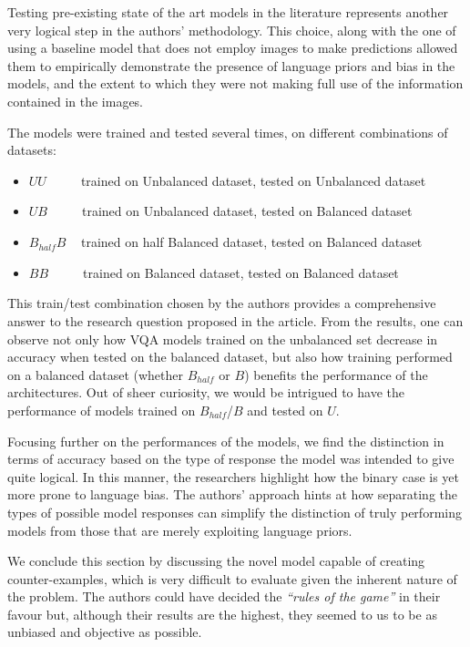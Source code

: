 \documentclass[letterpaper,11pt]{article}
\begin{document}
Testing pre-existing state of the art models in the literature represents another very logical step in the authors' methodology. This choice, along with the one of using a baseline model that does not employ images to make predictions allowed them to empirically demonstrate the presence of language priors and bias in the models, and the extent to which they were not making full use of the information contained in the images.

The models were trained and tested several times, on different combinations of datasets:
\begin{itemize}
  \itemsep-0.25em
  \item $UU$ \verb|    | trained on Unbalanced dataset, tested on Unbalanced dataset
  \item $UB$ \verb|    | trained on Unbalanced dataset, tested on Balanced dataset
  \item $B_{half}B$ \verb| | trained on half Balanced dataset, tested on Balanced dataset
  \item $BB$ \verb|    | trained on Balanced dataset, tested on Balanced dataset
\end{itemize}

This train/test combination chosen by the authors provides a comprehensive answer to the research question proposed in the article. From the results, one can observe not only how VQA models trained on the unbalanced set decrease in accuracy when tested on the balanced dataset, but also how training performed on a balanced dataset (whether $B_{half}$ or $B$) benefits the performance of the architectures. Out of sheer curiosity, we would be intrigued to have the performance of models trained on $B_{half}$/$B$ and tested on $U$.

Focusing further on the performances of the models, we find the distinction in terms of accuracy based on the type of response the model was intended to give quite logical. In this manner, the researchers highlight how the binary case is yet more prone to language bias. The authors' approach hints at how separating the types of possible model responses can simplify the distinction of truly performing models from those that are merely exploiting language priors. 

We conclude this section by discussing the novel model capable of creating counter-examples, which is very difficult to evaluate given the inherent nature of the problem. The authors could have decided the \textit{``rules of the game''} in their favour but, although their results are the highest, they seemed to us to be as unbiased and objective as possible.
\end{document}
